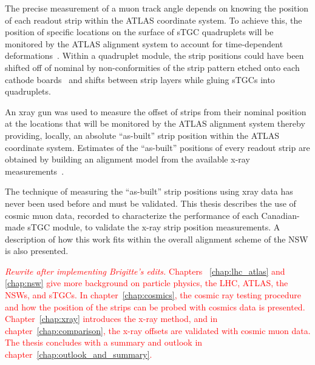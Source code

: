 The precise measurement of  a muon track angle depends on knowing the position of each readout strip within the  ATLAS coordinate system.  To achieve this, the position of specific locations on the surface of sTGC quadruplets will be monitored by the ATLAS alignment system to account for time-dependent deformations~\cite{nsw_tdr}. Within a quadruplet module, the strip positions could have been shifted off of nominal by non-conformities of the strip pattern etched onto each cathode boards~\cite{carlson_results_2019} and shifts between strip layers while gluing sTGCs into quadruplets.

An xray gun was used to measure the offset of strips from their nominal position at the locations that will be monitored by the ATLAS alignment system thereby providing, locally, an absolute “as-built” strip position within the ATLAS coordinate system.  Estimates of the “as-built” positions of every readout strip are obtained by building an alignment model from the available x-ray measurements~\cite{lefebvre_precision_2020}.

The technique of measuring the “as-built” strip positions using xray data has never been used before and must be validated. This thesis describes the use of cosmic muon data, recorded to characterize the performance of each Canadian-made sTGC module, to validate the x-ray strip position measurements.  A description of how this work fits within the overall alignment scheme of the NSW is also presented. 

\textcolor{red}{\textit{Rewrite after implementing Brigitte's edits.}}
\textcolor{red}{Chapters ~\ref{chap:lhc_atlas} and \ref{chap:nsw} give more background on particle physics, the LHC, ATLAS, the NSWs, and sTGCs. In chapter~\ref{chap:cosmics}, the cosmic ray testing procedure and how the position of the strips can be probed with cosmics data is presented. Chapter~\ref{chap:xray} introduces the x-ray method, and in chapter~\ref{chap:comparison}, the x-ray offsets are validated with cosmic muon data. The thesis concludes with a summary and outlook in chapter~\ref{chap:outlook_and_summary}.}

